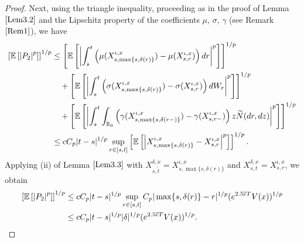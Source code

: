 \documentclass[11pt]{article}
\theoremstyle{theorem}
\theoremstyle{definition}
\newcommand{\bR}{\mathbb{R}}
\newcommand{\1}{{\bf 1}}
\begin{document}
\begin{proof}
 Next, using the triangle inequality, proceeding as in the proof of 
Lemma $\ref{Lem3.2}$ and the Lipschitz property of the coefficients $\mu$, $\sigma$, $\gamma$ (see  Remark $\ref{Rem1}$), we have
 \begin{align*}
\left[\mathbb{E}\left[\left|P_2\right|^p\right]\right]^{1/p} &  \le \left[\mathbb{E}\left[\left|\int_s^t \left ( \mu(X_{s,\max\{s,\delta(r)\}}^{\iota,x}) - \mu(X_{s,r}^{\iota,x}) \right)dr \right|^p\right]\right]^{1/p} \notag \\
   & \quad  + \left[\mathbb{E}\left[\left| \int_s^t \left( \sigma(X_{s,\max\{s,\delta(r)\}}^{\iota,x}) - \sigma(X_{s,r}^{\iota,x}) \right) dW_r \right|^p\right]\right]^{1/p}\notag \\
    &  \quad + \left[\mathbb{E}\left[\left|\int_s^t \int_{\bR_0} \left(\gamma (X_{s,\max\{s,\delta(r-)\}}^{\iota,x})-\gamma(X_{s,r-}^{\iota,x})\right) z \widetilde{N}(dr, dz)\right|^p\right]\right]^{1/p}\notag\\ 
    & \le  c C_p |t-s|^{1/p} \sup_{r\in [s, t]} \left [\mathbb{E}\left[ \left| X_{s,\max\{s,\delta(r)\}}^{\iota,x} -X_{s,r}^{\iota,x} \right|^p\right] \right]^{1/p}.
\end{align*}
Applying (ii) of Lemma $\ref{Lem3.3}$ with $X^{\delta, x}_{s,\widetilde{t}}=X_{s,\max\{s,\delta(r)\}}^{\iota,x}$ and $X^{\delta, x}_{s,t} = X_{s,r}^{\iota,x}$, we obtain 
\begin{align}
\left[\mathbb{E}\left[\left|P_2\right|^p\right]\right]^{1/p} & \leq c C_p |t-s|^{1/p} \sup_{r\in [s, t]} C_p | \max\{s,\delta(r)\} - r |^{1/p} (e^{2.5\overline{c}T}V(x))^{1/p}     \notag\\
&\le  c C_p |t-s|^{1/p} |\delta|^{1/p} (e^{2.5\overline{c}T}V(x))^{1/p}.
 \label{P2}
\end{align}

\end{proof}
\end{document}

